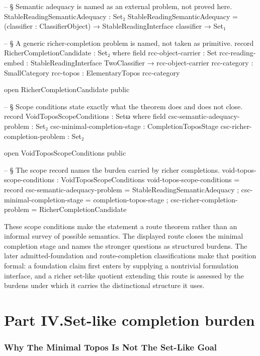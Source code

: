 \documentclass[11pt]{article}
\begin{document}
\begin{code}
-- § Semantic adequacy is named as an external problem, not proved here.
StableReadingSemanticAdequacy : Set₂
StableReadingSemanticAdequacy =
  (classifier : ClassifierObject) →
  StableReadingInterface classifier →
  Set₁

-- § A generic richer-completion problem is named, not taken as primitive.
record RicherCompletionCandidate : Set₂ where
  field
    rcc-object-carrier : Set
    rcc-reading-embed  : StableReadingInterface TwoClassifier → rcc-object-carrier
    rcc-category       : SmallCategory
    rcc-topos          : ElementaryTopos rcc-category

open RicherCompletionCandidate public

-- § Scope conditions state exactly what the theorem does and does not close.
record VoidToposScopeConditions : Setω where
  field
    csc-semantic-adequacy-problem : Set₂
    csc-minimal-completion-stage  : CompletionToposStage
    csc-richer-completion-problem : Set₂

open VoidToposScopeConditions public

-- § The scope record names the burden carried by richer completions.
void-topos-scope-conditions : VoidToposScopeConditions
void-topos-scope-conditions = record
  { csc-semantic-adequacy-problem = StableReadingSemanticAdequacy
  ; csc-minimal-completion-stage  = completion-topos-stage
  ; csc-richer-completion-problem = RicherCompletionCandidate
  }
\end{code}

These scope conditions make the statement a route theorem rather than an
informal survey of possible semantics.  The displayed route closes the
minimal completion stage and names the stronger questions as structured
burdens.  The later admitted-foundation and route-completion
classifications make that position formal: a foundation claim first
enters by supplying a nontrivial formulation interface, and a richer
set-like quotient extending this route is assessed by the burdens under
which it carries the distinctional structure it uses.

\part*{Part IV.\quad Set-like completion burden}

\section{Why The Minimal Topos Is Not The Set-Like Goal}
\end{document}
